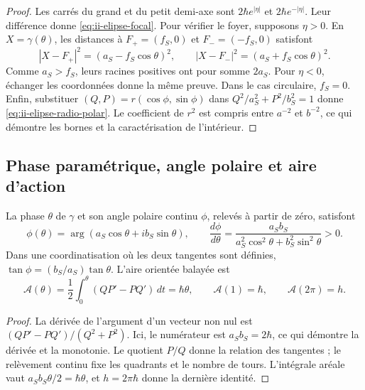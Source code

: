 \begin{proof}
Les carrés du grand et du petit demi-axe sont
\(2\hbar e^{|\eta|}\) et \(2\hbar e^{-|\eta|}\). Leur différence
donne \eqref{eq:ii-elipse-focal}. Pour vérifier le foyer, supposons
\(\eta>0\). En \(X=\gamma(\theta)\), les distances à
\(F_+=(f_S,0)\) et \(F_-=(-f_S,0)\) satisfont
\[
 |X-F_+|^2=(a_S-f_S\cos\theta)^2,\qquad
 |X-F_-|^2=(a_S+f_S\cos\theta)^2.
\]
Comme \(a_S>f_S\), leurs racines positives ont pour somme \(2a_S\).
Pour \(\eta<0\), échanger les coordonnées donne la même preuve.
Dans le cas circulaire, \(f_S=0\). Enfin, substituer
\((Q,P)=r(\cos\phi,\sin\phi)\) dans
\(Q^2/a_S^2+P^2/b_S^2=1\) donne
\eqref{eq:ii-elipse-radio-polar}. Le coefficient de \(r^2\) est
compris entre \(a^{-2}\) et \(b^{-2}\), ce qui démontre les bornes et la
caractérisation de l'intérieur.
\end{proof}

\subsection{Phase paramétrique, angle polaire et aire d'action}
\label{sec:ii-elipse-fase-area}

\begin{proposition}
\label{prop:ii-elipse-area}
La phase \(\theta\) de \(\gamma\) et son angle polaire continu
\(\phi\), relevés à partir de zéro, satisfont
\begin{equation}
 \phi(\theta)=\arg(a_S\cos\theta+i b_S\sin\theta),\qquad
 \frac{d\phi}{d\theta}
 =\frac{a_Sb_S}{a_S^2\cos^2\theta+b_S^2\sin^2\theta}>0.
 \label{eq:ii-elipse-fases}
\end{equation}
Dans une coordinatisation où les deux tangentes sont définies,
\(\tan\phi=(b_S/a_S)\tan\theta\). L’aire orientée balayée est
\begin{equation}
 \mathcal A(\theta)=\frac12\int_0^\theta(QP'-PQ')\,dt
 =\hbar\theta,\qquad
 \mathcal A(1)=\hbar,\qquad \mathcal A(2\pi)=h.
 \label{eq:ii-elipse-area-fase}
\end{equation}
\end{proposition}

\begin{proof}
La dérivée de l'argument d'un vecteur non nul est
\((QP'-PQ')/(Q^2+P^2)\). Ici, le numérateur est
\(a_Sb_S=2\hbar\), ce qui démontre la dérivée et la monotonie.
Le quotient \(P/Q\) donne la relation des tangentes ; le relèvement
continu fixe les quadrants et le nombre de tours. L'intégrale aréale
vaut \(a_Sb_S\theta/2=\hbar\theta\), et
\(h=2\pi\hbar\) donne la dernière identité.
\end{proof}

